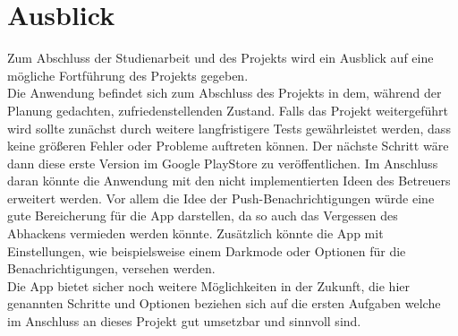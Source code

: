 \section{Ausblick}\label{sec:Ausblick}
Zum Abschluss der Studienarbeit und des Projekts wird ein Ausblick auf eine mögliche Fortführung des Projekts gegeben.\\
Die Anwendung befindet sich zum Abschluss des Projekts in dem, während der Planung gedachten, zufriedenstellenden Zustand. Falls das Projekt weitergeführt wird sollte zunächst durch weitere langfristigere Tests gewährleistet werden, dass keine größeren Fehler oder Probleme auftreten können. Der nächste Schritt wäre dann diese erste Version im Google PlayStore zu veröffentlichen. Im Anschluss daran könnte die Anwendung mit den nicht implementierten Ideen des Betreuers erweitert werden. Vor allem die Idee der Push-Benachrichtigungen würde eine gute Bereicherung für die App darstellen, da so auch das Vergessen des Abhackens vermieden werden könnte. Zusätzlich könnte die App mit Einstellungen, wie beispielsweise einem Darkmode oder Optionen für die Benachrichtigungen, versehen werden.\\
Die App bietet sicher noch weitere Möglichkeiten in der Zukunft, die hier genannten Schritte und Optionen beziehen sich auf die ersten Aufgaben welche im Anschluss an dieses Projekt gut umsetzbar und sinnvoll sind.